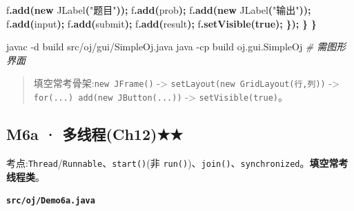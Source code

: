 \documentclass[
  11pt,
]{ctexart}
\newenvironment{Shaded}{\begin{snugshade}}{\end{snugshade}}
\newcommand{\AttributeTok}[1]{\textcolor[rgb]{0.13,0.29,0.53}{#1}}
\newcommand{\BuiltInTok}[1]{#1}
\newcommand{\CommentTok}[1]{\textcolor[rgb]{0.56,0.35,0.01}{\textit{#1}}}
\newcommand{\ExtensionTok}[1]{#1}
\newcommand{\FunctionTok}[1]{\textcolor[rgb]{0.13,0.29,0.53}{\textbf{#1}}}
\newcommand{\KeywordTok}[1]{\textcolor[rgb]{0.13,0.29,0.53}{\textbf{#1}}}
\newcommand{\NormalTok}[1]{#1}
\newcommand{\OperatorTok}[1]{\textcolor[rgb]{0.81,0.36,0.00}{\textbf{#1}}}
\newcommand{\StringTok}[1]{\textcolor[rgb]{0.31,0.60,0.02}{#1}}
\begin{document}
\begin{Shaded}
\begin{Highlighting}[]
\NormalTok{            f}\OperatorTok{.}\FunctionTok{add}\OperatorTok{(}\KeywordTok{new} \BuiltInTok{JLabel}\OperatorTok{(}\StringTok{"题目"}\OperatorTok{));}\NormalTok{ f}\OperatorTok{.}\FunctionTok{add}\OperatorTok{(}\NormalTok{prob}\OperatorTok{);}
\NormalTok{            f}\OperatorTok{.}\FunctionTok{add}\OperatorTok{(}\KeywordTok{new} \BuiltInTok{JLabel}\OperatorTok{(}\StringTok{"输出"}\OperatorTok{));}\NormalTok{ f}\OperatorTok{.}\FunctionTok{add}\OperatorTok{(}\NormalTok{input}\OperatorTok{);}
\NormalTok{            f}\OperatorTok{.}\FunctionTok{add}\OperatorTok{(}\NormalTok{submit}\OperatorTok{);}\NormalTok{ f}\OperatorTok{.}\FunctionTok{add}\OperatorTok{(}\NormalTok{result}\OperatorTok{);}
\NormalTok{            f}\OperatorTok{.}\FunctionTok{setVisible}\OperatorTok{(}\KeywordTok{true}\OperatorTok{);}
        \OperatorTok{\});}
    \OperatorTok{\}}
\OperatorTok{\}}
\end{Highlighting}
\end{Shaded}

\begin{Shaded}
\begin{Highlighting}[]
\ExtensionTok{javac} \AttributeTok{{-}d}\NormalTok{ build src/oj/gui/SimpleOj.java}
\ExtensionTok{java} \AttributeTok{{-}cp}\NormalTok{ build oj.gui.SimpleOj                   }\CommentTok{\# 需图形界面}
\end{Highlighting}
\end{Shaded}

\begin{quote}
填空常考骨架:\texttt{new\ JFrame()} -\textgreater{}
\texttt{setLayout(new\ GridLayout(行,列))} -\textgreater{}
\texttt{for(...)\ add(new\ JButton(...))} -\textgreater{}
\texttt{setVisible(true)}。
\end{quote}

\hypertarget{m6a-ux591aux7ebfux7a0bch12}{%
\subsection{M6a · 多线程(Ch12)★★}\label{m6a-ux591aux7ebfux7a0bch12}}

考点:\texttt{Thread}/\texttt{Runnable}、\texttt{start()}(非
\texttt{run()})、\texttt{join()}、\texttt{synchronized}。\textbf{填空常考线程类}。

\textbf{\texttt{src/oj/Demo6a.java}}
\end{document}
